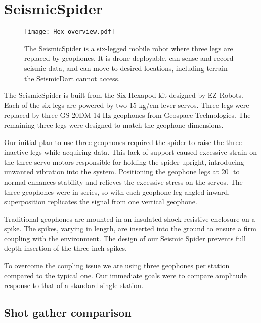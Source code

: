 \section{SeismicSpider}\label{sec:SeismicSpider}


\begin{figure} \centering
  {\texttt{[image: Hex\_overview.pdf]}}
 \caption{The SeismicSpider is a six-legged mobile robot where three legs are replaced by geophones. It is drone deployable, can sense and record seismic data, and can move to desired locations, including terrain the SeismicDart cannot access.} 
 \label{fig:TradvsAutoDrop}
\end{figure}


The SeismicSpider is built from the Six Hexapod kit designed by EZ Robots. Each of the six legs are powered by two 15 kg/cm lever servos. Three legs were replaced by three GS-20DM 14 Hz geophones from Geospace Technologies. The remaining three legs were designed to match the geophone dimensions.

 Our initial plan to use three geophones required the spider to raise the three inactive legs while acquiring data. This lack of support caused excessive strain on the three servo motors responsible for holding the spider upright, introducing unwanted vibration into the system.  Positioning the geophone legs at 20$^\circ$ to normal enhances stability and relieves the excessive stress on the servos. 
 The three geophones were in series, so with each geophone leg angled inward, superposition replicates the signal from one vertical geophone.
 
 Traditional geophones are mounted in an insulated shock resistive enclosure on a spike. The spikes, varying in length, are inserted into the ground to ensure a firm coupling with the environment. The design of our Seismic Spider prevents full depth insertion of the three inch spikes. 

	To overcome the coupling issue we are using three geophones per station compared to the typical one. Our immediate goals were to compare amplitude response to that of a standard single station.	
 

\subsection{Shot gather comparison}

